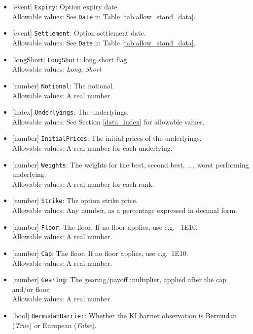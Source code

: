 \begin{itemize}
  \item{}[event] \lstinline!Expiry!: Option expiry date. \\
  Allowable values: See \lstinline!Date! in Table \ref{tab:allow_stand_data}.
  \item{}[event] \lstinline!Settlement!: Option settlement date. \\
  Allowable values: See \lstinline!Date! in Table \ref{tab:allow_stand_data}.
  \item{}[longShort] \lstinline!LongShort!: long short flag. \\
  Allowable values: \emph{Long}, \emph{Short}
  \item{}[number] \lstinline!Notional!: The notional. \\
  Allowable values: A real number.
  \item{}[index] \lstinline!Underlyings!: The underlyings. \\
  Allowable values: See Section \ref{data_index} for allowable values.
  \item{}[number] \lstinline!InitialPrices!: The initial prices of the underlyings.\\
  Allowable values: A real number for each underlying.
  \item{}[number] \lstinline!Weights!: The weights for the best, second best, ..., worst performing underlying.\\
  Allowable values: A real number for each rank.
  \item{}[number] \lstinline!Strike!: The option strike price. \\
  Allowable values: Any number, as a percentage expressed in decimal form.
  \item{}[number] \lstinline!Floor!: The floor. If no floor applies, use e.g.\ -1E10. \\
  Allowable values: A real number.
  \item{}[number] \lstinline!Cap!: The floor. If no floor applies, use e.g.\ 1E10. \\
  Allowable values: A real number.
  \item{}[number] \lstinline!Gearing!: The gearing/payoff multiplier, applied after the cap and/or floor. \\
  Allowable values: A real number.
  \item{}[bool] \lstinline!BermudanBarrier!: Whether the KI barrier observation is Bermudan (\emph{True}) or European
  (\emph{False}). \\

\end{itemize}
